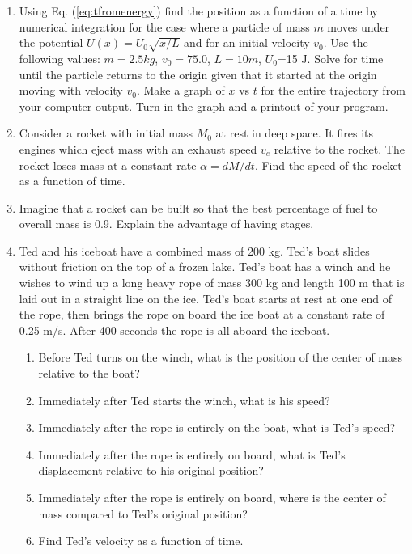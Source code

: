 \begin{enumerate}
\item Using Eq. (\ref{eq:tfromenergy}) find the position as a function of a time by numerical integration for the case where a particle of mass $m$ moves under the potential $U(x)=U_0\sqrt{x/L}$ and for an initial velocity $v_0$. Use the following values: $m=2.5 kg$, $v_0=75.0$, $L=10 m$, $U_0$=15 J. Solve for time until the particle returns to the origin given that it started at the origin moving with velocity $v_0$. Make a graph of $x$ vs $t$ for the entire trajectory from your computer output. Turn in the graph and a printout of your program.

\item Consider a rocket with initial mass $M_0$ at rest in deep space. It fires its engines which eject mass with an exhaust speed $v_e$ relative to the rocket. The rocket loses mass at a constant rate $\alpha=dM/dt$. Find the speed of the rocket as a function of time.

\item Imagine that a rocket can be built so that the best percentage of fuel to overall mass is 0.9. Explain the advantage of having stages.

\item Ted and his iceboat have a combined mass of 200 kg. Ted's boat slides without friction on the top of a frozen lake. Ted's boat has a winch and he wishes to wind up a long heavy rope of mass 300  kg and length 100 m that is laid out in a straight line on the ice. Ted's boat starts at rest at one end of the rope, then brings the rope on board the ice boat at a constant rate of 0.25 m/s. After 400 seconds the rope is all aboard the iceboat.
\begin{enumerate}
\item Before Ted turns on the winch, what is the position of the center of mass relative to the boat?
\item Immediately after Ted starts the winch, what is his speed?
\item Immediately after the rope is entirely on the boat, what is Ted's speed?
\item Immediately after the rope is entirely on board, what is Ted's displacement relative to his original position?
\item Immediately after the rope is entirely on board, where is the center of mass compared to Ted's original position?
\item Find Ted's velocity as a function of time.
\end{enumerate}


\end{enumerate}
